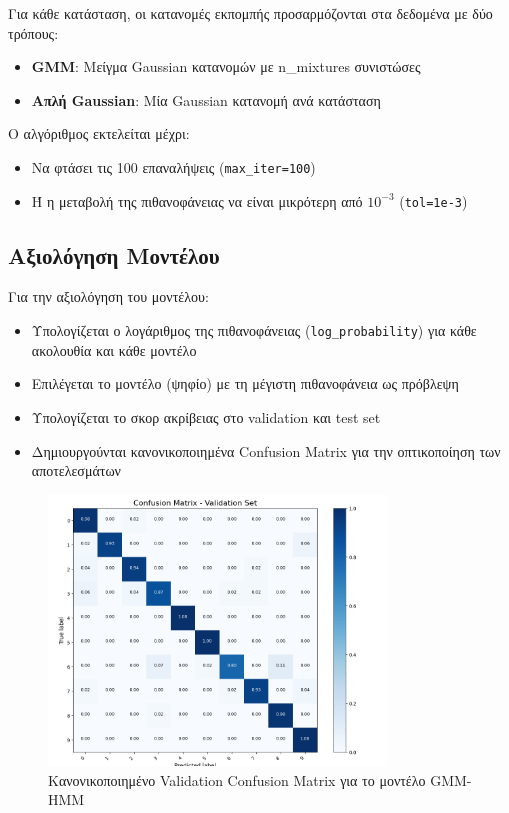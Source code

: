\documentclass[a4paper,12pt]{article}
\begin{document}
Για κάθε κατάσταση, οι κατανομές εκπομπής προσαρμόζονται στα δεδομένα με δύο τρόπους:
\begin{itemize}
    \item \textbf{GMM}: Μείγμα Gaussian κατανομών με n\_mixtures συνιστώσες
    \item \textbf{Απλή Gaussian}: Μία Gaussian κατανομή ανά κατάσταση
\end{itemize}

Ο αλγόριθμος εκτελείται μέχρι:
\begin{itemize}
    \item Να φτάσει τις 100 επαναλήψεις (\texttt{max\_iter=100})
    \item Ή η μεταβολή της πιθανοφάνειας να είναι μικρότερη από $10^{-3}$ (\texttt{tol=1e-3})
\end{itemize}

\subsection*{Αξιολόγηση Μοντέλου}
Για την αξιολόγηση του μοντέλου:
\begin{itemize}
    \item Υπολογίζεται ο λογάριθμος της πιθανοφάνειας (\texttt{log\_probability}) για κάθε ακολουθία και κάθε μοντέλο
    \item Επιλέγεται το μοντέλο (ψηφίο) με τη μέγιστη πιθανοφάνεια ως πρόβλεψη
    \item Υπολογίζεται το σκορ ακρίβειας στο validation και test set
    \item Δημιουργούνται κανονικοποιημένα Confusion Matrix για την οπτικοποίηση των αποτελεσμάτων
\end{itemize}

\begin{figure}[h]
    \centering
    \includegraphics[width=0.8\textwidth]{hmm_val_cm.png}
    \caption{Κανονικοποιημένο Validation Confusion Matrix για το μοντέλο GMM-HMM}
    \label{fig:hmm_confusion_matrix}
\end{figure}
\end{document}
